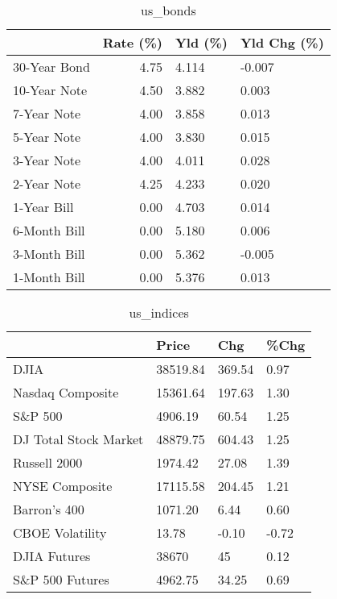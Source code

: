 \documentclass{article}%
\begin{document}
%


\begin{table}[htbp]%
\caption{us\_bonds}%
\centering%
\begin{adjustbox}{width=1\textwidth}%
\begin{tabular}{lrll}
\toprule
             &  Rate (\%) & Yld (\%) & Yld Chg (\%) \\
\midrule
30-Year Bond &      4.75 &   4.114 &      -0.007 \\
10-Year Note &      4.50 &   3.882 &       0.003 \\
 7-Year Note &      4.00 &   3.858 &       0.013 \\
 5-Year Note &      4.00 &   3.830 &       0.015 \\
 3-Year Note &      4.00 &   4.011 &       0.028 \\
 2-Year Note &      4.25 &   4.233 &       0.020 \\
 1-Year Bill &      0.00 &   4.703 &       0.014 \\
6-Month Bill &      0.00 &   5.180 &       0.006 \\
3-Month Bill &      0.00 &   5.362 &      -0.005 \\
1-Month Bill &      0.00 &   5.376 &       0.013 \\
\bottomrule
\end{tabular}
%
\end{adjustbox}%
\end{table}

%


\begin{table}[htbp]%
\caption{us\_indices}%
\centering%
\begin{adjustbox}{width=1\textwidth}%
\begin{tabular}{llll}
\toprule
                      &    Price &    Chg &  \%Chg \\
\midrule
                 DJIA & 38519.84 & 369.54 &  0.97 \\
     Nasdaq Composite & 15361.64 & 197.63 &  1.30 \\
              S\&P 500 &  4906.19 &  60.54 &  1.25 \\
DJ Total Stock Market & 48879.75 & 604.43 &  1.25 \\
         Russell 2000 &  1974.42 &  27.08 &  1.39 \\
       NYSE Composite & 17115.58 & 204.45 &  1.21 \\
         Barron's 400 &  1071.20 &   6.44 &  0.60 \\
      CBOE Volatility &    13.78 &  -0.10 & -0.72 \\
         DJIA Futures &    38670 &     45 &  0.12 \\
      S\&P 500 Futures &  4962.75 &  34.25 &  0.69 \\
\bottomrule
\end{tabular}
%
\end{adjustbox}%
\end{table}
\end{document}
